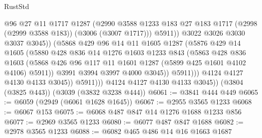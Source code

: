 \begin{lexlean}{RustStd}
\begin{coremodule}
                              @96
                              @27
                              @11
                              @1717
                              @1287
                              (@2990
                                @3588
                                @1233
                                @183
                                @27
                                @183
                                @1717
                                (@2998 (@2999 @3588 @183))
                                (@3006 (@3007 @1717)))
                              @5911))
                          @3022
                          @3026
                          @3030
                          @3037
                          @3045))
                      (@5868
                        @429
                        @96
                        @14
                        @11
                        @1605
                        @1287
                        (@5876
                          @429
                          @14
                          @1605
                          (@5880
                            @428
                            @836
                            @14
                            @1276
                            @1603
                            @1233
                            @843
                            (@5863
                              @428
                              @836
                              @1603
                              (@5868
                                @426
                                @96
                                @117
                                @11
                                @1601
                                @1287
                                (@5899 @425 @1601 @4102 @4106)
                                @5911))
                            @3991
                            @3994
                            @3997
                            @4000
                            @3045))
                        @5911)))
                  @4124
                  @4127
                  @4130
                  @4133
                  @3045))
              @5911)))
        @4124
        @4127
        @4130
        @4133
        @3045))
    (@3804 (@3825 @443))
    (@3039 (@3832 @3238 @444))
@6061 := @3841 @444 @449
@6065 := @6059 (@2949 (@6061 @1628 @1645))
@6067 := @2955 @3565 @1233
@6068 := @6067 @153
@6075 := @6068 @487 @847 @14 @1276 @1688 @1233 @856
@6077 := @2969 @3565 @1233
@6080 := @6077 @487 @847 @1688
@6082 := @2978 @3565 @1233
@6088 := @6082 @465 @486 @14 @16 @1663 @1687

\end{coremodule}
\end{lexlean}
